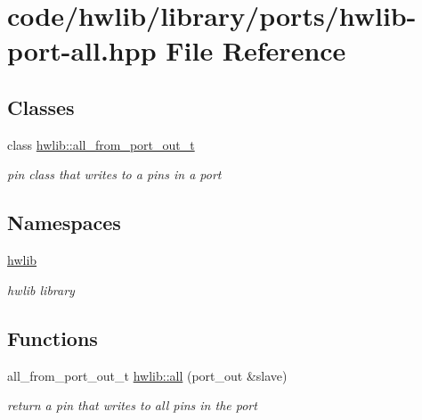 \hypertarget{hwlib-port-all_8hpp}{}\section{code/hwlib/library/ports/hwlib-\/port-\/all.hpp File Reference}
\label{hwlib-port-all_8hpp}
\subsection*{Classes}
\begin{DoxyCompactItemize}
\item 
class \hyperlink{classhwlib_1_1all__from__port__out__t}{hwlib\+::all\+\_\+from\+\_\+port\+\_\+out\+\_\+t}
\begin{DoxyCompactList}\small\item\em pin class that writes to a pins in a port \end{DoxyCompactList}\end{DoxyCompactItemize}
\subsection*{Namespaces}
\begin{DoxyCompactItemize}
\item 
 \hyperlink{namespacehwlib}{hwlib}
\begin{DoxyCompactList}\small\item\em hwlib library \end{DoxyCompactList}\end{DoxyCompactItemize}
\subsection*{Functions}
\begin{DoxyCompactItemize}
\item 
\mbox{\label{namespacehwlib_acf19508f1fedc022e59b834d9cf5c3cd}} 
all\+\_\+from\+\_\+port\+\_\+out\+\_\+t \hyperlink{namespacehwlib_acf19508f1fedc022e59b834d9cf5c3cd}{hwlib\+::all} (port\+\_\+out \&slave)
\begin{DoxyCompactList}\small\item\em return a pin that writes to all pins in the port \end{DoxyCompactList}\end{DoxyCompactItemize}
